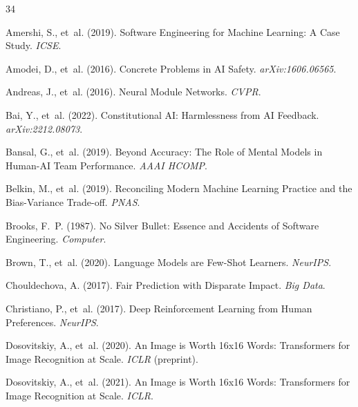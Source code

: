 \documentclass[11pt,a4paper]{article}
\begin{document}
\begin{thebibliography}{34}

Amershi, S., et~al. (2019).
\newblock Software Engineering for Machine Learning: A Case Study.
\newblock \emph{ICSE}.

Amodei, D., et~al. (2016).
\newblock Concrete Problems in AI Safety.
\newblock \emph{arXiv:1606.06565}.

Andreas, J., et~al. (2016).
\newblock Neural Module Networks.
\newblock \emph{CVPR}.

Bai, Y., et~al. (2022).
\newblock Constitutional AI: Harmlessness from AI Feedback.
\newblock \emph{arXiv:2212.08073}.

Bansal, G., et~al. (2019).
\newblock Beyond Accuracy: The Role of Mental Models in Human-AI Team Performance.
\newblock \emph{AAAI HCOMP}.

Belkin, M., et~al. (2019).
\newblock Reconciling Modern Machine Learning Practice and the Bias-Variance Trade-off.
\newblock \emph{PNAS}.

Brooks, F.~P. (1987).
\newblock No Silver Bullet: Essence and Accidents of Software Engineering.
\newblock \emph{Computer}.

Brown, T., et~al. (2020).
\newblock Language Models are Few-Shot Learners.
\newblock \emph{NeurIPS}.

Chouldechova, A. (2017).
\newblock Fair Prediction with Disparate Impact.
\newblock \emph{Big Data}.

Christiano, P., et~al. (2017).
\newblock Deep Reinforcement Learning from Human Preferences.
\newblock \emph{NeurIPS}.

Dosovitskiy, A., et~al. (2020).
\newblock An Image is Worth 16x16 Words: Transformers for Image Recognition at Scale.
\newblock \emph{ICLR} (preprint).

Dosovitskiy, A., et~al. (2021).
\newblock An Image is Worth 16x16 Words: Transformers for Image Recognition at Scale.
\newblock \emph{ICLR}.


\end{thebibliography}
\end{document}
